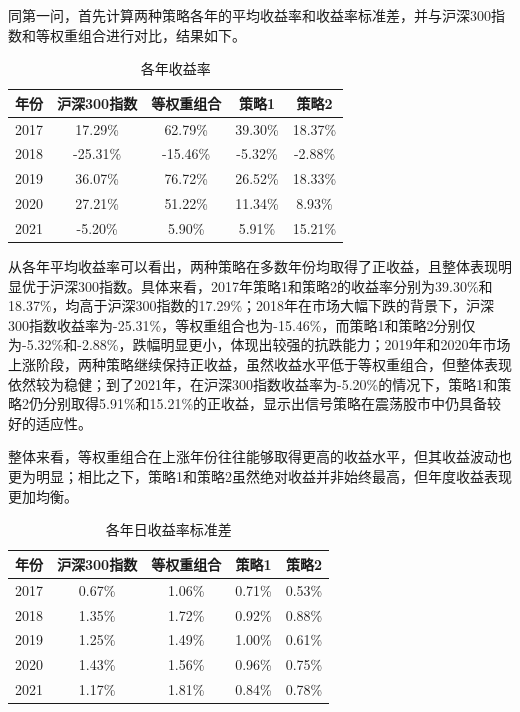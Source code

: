 \documentclass[a4paper,12pt]{article}
\begin{document}
同第一问，首先计算两种策略各年的平均收益率和收益率标准差，并与沪深300指数和等权重组合进行对比，结果如下。

\begin{table}[H]
\centering
\caption{各年收益率}
\begin{tabular}{lcccc}
\toprule
年份 & 沪深300指数 & 等权重组合 & 策略1 & 策略2 \\
\midrule
2017 & 17.29\% & 62.79\% & 39.30\% & 18.37\% \\
2018 & -25.31\% & -15.46\% & -5.32\% & -2.88\% \\
2019 & 36.07\% & 76.72\% & 26.52\% & 18.33\% \\
2020 & 27.21\% & 51.22\% & 11.34\% & 8.93\% \\
2021 & -5.20\% & 5.90\% & 5.91\% & 15.21\% \\
\bottomrule
\end{tabular}
\end{table}

从各年平均收益率可以看出，两种策略在多数年份均取得了正收益，且整体表现明显优于沪深300指数。具体来看，2017年策略1和策略2的收益率分别为39.30\%和18.37\%，均高于沪深300指数的17.29\%；2018年在市场大幅下跌的背景下，沪深300指数收益率为-25.31\%，等权重组合也为-15.46\%，而策略1和策略2分别仅为-5.32\%和-2.88\%，跌幅明显更小，体现出较强的抗跌能力；2019年和2020年市场上涨阶段，两种策略继续保持正收益，虽然收益水平低于等权重组合，但整体表现依然较为稳健；到了2021年，在沪深300指数收益率为-5.20\%的情况下，策略1和策略2仍分别取得5.91\%和15.21\%的正收益，显示出信号策略在震荡股市中仍具备较好的适应性。

整体来看，等权重组合在上涨年份往往能够取得更高的收益水平，但其收益波动也更为明显；相比之下，策略1和策略2虽然绝对收益并非始终最高，但年度收益表现更加均衡。

\begin{table}[H]
\centering
\caption{各年日收益率标准差}
\begin{tabular}{lcccc}
\toprule
年份 & 沪深300指数 & 等权重组合 & 策略1 & 策略2 \\
\midrule
2017 & 0.67\% & 1.06\% & 0.71\% & 0.53\% \\
2018 & 1.35\% & 1.72\% & 0.92\% & 0.88\% \\
2019 & 1.25\% & 1.49\% & 1.00\% & 0.61\% \\
2020 & 1.43\% & 1.56\% & 0.96\% & 0.75\% \\
2021 & 1.17\% & 1.81\% & 0.84\% & 0.78\% \\
\bottomrule
\end{tabular}
\end{table}
\end{document}
